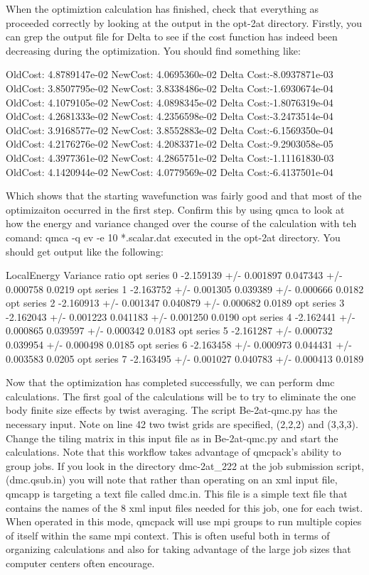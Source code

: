 When the optimiztion calculation has finished, check that everything as proceeded correctly by looking at the output in the opt-2at directory.  Firstly, you can grep the output file for Delta to see if the cost function has indeed been decreasing during the optimization.  You should find something like:
\begin{shade}
 OldCost: 4.8789147e-02 NewCost: 4.0695360e-02 Delta Cost:-8.0937871e-03
 OldCost: 3.8507795e-02 NewCost: 3.8338486e-02 Delta Cost:-1.6930674e-04
 OldCost: 4.1079105e-02 NewCost: 4.0898345e-02 Delta Cost:-1.8076319e-04
 OldCost: 4.2681333e-02 NewCost: 4.2356598e-02 Delta Cost:-3.2473514e-04
 OldCost: 3.9168577e-02 NewCost: 3.8552883e-02 Delta Cost:-6.1569350e-04
 OldCost: 4.2176276e-02 NewCost: 4.2083371e-02 Delta Cost:-9.2903058e-05
 OldCost: 4.3977361e-02 NewCost: 4.2865751e-02 Delta Cost:-1.11161830-03
 OldCost: 4.1420944e-02 NewCost: 4.0779569e-02 Delta Cost:-6.4137501e-04
\end{shade}
Which shows that the starting wavefunction was fairly good and that most of the optimizaiton occurred in the first step.  Confirm this by using qmca to look at how the energy and variance changed over the course of the calculation with teh comand: qmca -q ev -e 10 *.scalar.dat executed in the opt-2at directory.  You should get output like the following:
\begin{shade}
                 LocalEnergy               Variance             ratio
opt  series 0  -2.159139 +/- 0.001897   0.047343 +/- 0.000758   0.0219 
opt  series 1  -2.163752 +/- 0.001305   0.039389 +/- 0.000666   0.0182 
opt  series 2  -2.160913 +/- 0.001347   0.040879 +/- 0.000682   0.0189 
opt  series 3  -2.162043 +/- 0.001223   0.041183 +/- 0.001250   0.0190 
opt  series 4  -2.162441 +/- 0.000865   0.039597 +/- 0.000342   0.0183 
opt  series 5  -2.161287 +/- 0.000732   0.039954 +/- 0.000498   0.0185 
opt  series 6  -2.163458 +/- 0.000973   0.044431 +/- 0.003583   0.0205 
opt  series 7  -2.163495 +/- 0.001027   0.040783 +/- 0.000413   0.0189 
\end{shade}

Now that the optimization has completed successfully, we can perform dmc calculations.  The first goal of the calculations will be to try to eliminate the one body finite size effects by twist averaging.  The script Be-2at-qmc.py has the necessary input.  Note on line 42 two twist grids are specified, (2,2,2) and (3,3,3).  Change the tiling matrix in this input file as in Be-2at-qmc.py and start the calculations.  Note that this workflow takes advantage of qmcpack's ability to group jobs.  If you look in the directory dmc-2at\_222 at the job submission script, (dmc.qsub.in) you will note that rather than operating on an xml input file, qmcapp is targeting a text file called dmc.in.  This file is a simple text file that contains the names of the 8 xml input files needed for this job, one for each twist.  When operated in this mode, qmcpack will use mpi groups to run multiple copies of itself within the same mpi context.  This is often useful both in terms of organizing calculations and also for taking advantage of the large job sizes that computer centers often encourage.

